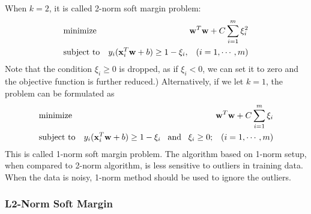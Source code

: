 When $k=2$, it is called 2-norm soft margin problem:
\begin{eqnarray}
&	\mbox{minimize}	  & {\bf w}^T {\bf w}+C\sum_{i=1}^m \xi_i^2
	\nonumber \\
&	\mbox{subject to} & y_i ({\bf x}_i^T {\bf w}+b) \ge 1-\xi_i,\;\;\;(i=1,\cdots,m)
	\nonumber \\
\end{eqnarray}
Note that the condition $\xi_i \ge 0$ is dropped, as if $\xi_i<0$, we can
set it to zero and the objective function is further reduced.) 
Alternatively, if we let $k=1$, the problem can be formulated as
\begin{eqnarray}
&	\mbox{minimize}		& {\bf w}^T {\bf w}+C\sum_{i=1}^m \xi_i
	\nonumber \\
&	\mbox{subject to}	& y_i ({\bf x}_i^T {\bf w}+b) \ge 1-\xi_i
	\;\;\;\mbox{and}\;\;\;\xi_i \ge 0;\;\;\;(i=1,\cdots,m)
	\nonumber \\
\end{eqnarray}
This is called 1-norm soft margin problem. The algorithm based on 1-norm
setup, when compared to 2-norm algorithm, is less sensitive to outliers in 
training data. When the data is noisy, 1-norm method should be used to 
ignore the outliers.

\subsubsection*{L2-Norm Soft Margin}

